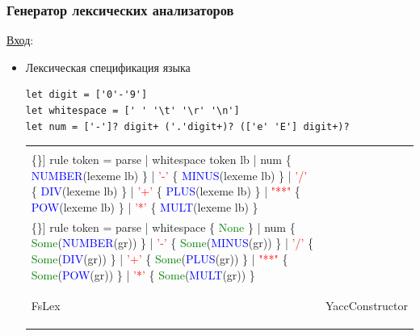 \documentclass{beamer}
\begin{document}
\begin{frame}[fragile]
\transwipe[direction=90]
\frametitle{Генератор лексических анализаторов}
\underline{Вход}: \\ 
\begin{itemize}
\item Лексическая спецификация языка
\begin{verbatim}
let digit = ['0'-'9']
let whitespace = [' ' '\t' '\r' '\n']
let num = ['-']? digit+ ('.'digit+)? (['e' 'E'] digit+)?
\end{verbatim}
\begin{tabular}{l | r}
\begin{minipage}{.4\textwidth} 
\footnotesize 
\begin{Verbatim}[commandchars=\\\{\}]
rule token = parse
| whitespace { token lb }
| num  \{ \textcolor{blue}{NUMBER}(lexeme lb) \}
| \textcolor{red}{'-'}  \{ \textcolor{blue}{MINUS}(lexeme lb) \}
| \textcolor{red}{'/'}  \{ \textcolor{blue}{DIV}(lexeme lb) \}
| \textcolor{red}{'+'}  \{ \textcolor{blue}{PLUS}(lexeme lb) \}
| \textcolor{red}{"**"} \{ \textcolor{blue}{POW}(lexeme lb) \}
| \textcolor{red}{'*'}  \{ \textcolor{blue}{MULT}(lexeme lb) \}
\end{Verbatim}
\normalsize
\end{minipage}
&
\begin{minipage}{.4\textwidth}
 \footnotesize 
\begin{Verbatim}[commandchars=\\\{\}]
rule token = parse
| whitespace \{ \textcolor{green}{None} \}
| num  \{ \textcolor{green}{Some}(\textcolor{blue}{NUMBER}(gr)) \}
| \textcolor{red}{'-'}  \{ \textcolor{green}{Some}(\textcolor{blue}{MINUS}(gr)) \}
| \textcolor{red}{'/'}  \{ \textcolor{green}{Some}(\textcolor{blue}{DIV}(gr)) \}
| \textcolor{red}{'+'}  \{ \textcolor{green}{Some}(\textcolor{blue}{PLUS}(gr)) \}
| \textcolor{red}{"**"} \{ \textcolor{green}{Some}(\textcolor{blue}{POW}(gr)) \}
| \textcolor{red}{'*'}  \{ \textcolor{green}{Some}(\textcolor{blue}{MULT}(gr)) \}
\end{Verbatim} 
\normalsize
\end{minipage} \\
\hline 

\begin{minipage}{.4\textwidth}
\begin{center}
 \footnotesize FsLex 
 \normalsize
 \end{center}
\end{minipage}
&
\begin{minipage}{.4\textwidth}
\begin{center}
 \footnotesize YaccConstructor 
 \normalsize
 \end{center}
\end{minipage}
\end{tabular}


\end{itemize}
\end{frame}
\end{document}

